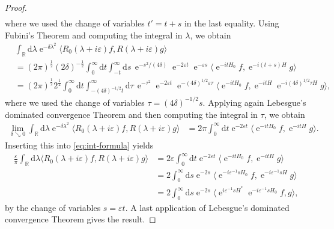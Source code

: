 \documentclass[10pt,a4paper]{amsart}
\def\R{\mathbb R}
\def\d{\mathrm{d}}
\def\e{\mathop{\mathrm{e}}\nolimits}
\begin{document}
\begin{proof}
\begin{align*}
\end{align*}
where we used the change of variables $t'=t+s$ in the last equality. Using Fubini's Theorem and computing the integral in $\lambda$, we obtain
\begin{align*}
&\int_{\R}\d \lambda \e^{-\delta\lambda^2} \langle R_0(\lambda+i \varepsilon)f, R(\lambda + i \varepsilon) g\rangle \\
&= (2\pi)^\frac12 (2\delta)^{-\frac12} \int_0^\infty \d t \int_{-t}^\infty \d s \,  \e^{-s^2/(4\delta)} \e^{-2\varepsilon t} \e^{-\varepsilon s}  \langle \e^{-itH_0}f, \e^{-i(t+s)H} g\rangle \\
&= (2\pi)^{\frac12} 2^\frac12 \int_0^\infty \d t \int_{-(4\delta)^{-1/2}t}^\infty \d \tau \,  \e^{-\tau^2} \e^{-2\varepsilon t} \e^{-(4\delta)^{1/2}\varepsilon \tau}  \langle \e^{-itH_0}f, \e^{-itH} \e^{-i(4\delta)^{1/2}\tau H} g\rangle ,
\end{align*}
where we used the change of variables $\tau=(4\delta)^{-1/2}s$. Applying again Lebesgue's dominated convergence Theorem and then computing the integral in $\tau$, we obtain
\begin{align*}
\lim_{\delta\searrow 0}\int_{\R}\d \lambda \e^{-\delta\lambda^2} \langle R_0(\lambda+i \varepsilon)f, R(\lambda + i \varepsilon) g\rangle &= 2\pi \int_0^\infty \d t \e^{-2\varepsilon t}  \langle \e^{-itH_0}f, \e^{-itH} g\rangle.
\end{align*}
Inserting this into \eqref{eq:int-formula} yields
\begin{align*}
\frac{\varepsilon}{\pi} \int_{\R}\d \lambda \langle R_0(\lambda+i \varepsilon)f, R(\lambda + i \varepsilon) g\rangle &= 2\varepsilon \int_0^\infty \d t \e^{-2\varepsilon t}  \langle \e^{-itH_0}f, \e^{-itH} g\rangle\\
&= 2 \int_0^\infty \d s \e^{-2s}  \langle \e^{-i\varepsilon^{-1}sH_0}f, \e^{-i\varepsilon^{-1}sH} g\rangle \\
&= 2 \int_0^\infty \d s \e^{-2s}  \langle \e^{i\varepsilon^{-1}sH^*} \e^{-i\varepsilon^{-1}sH_0}f,  g\rangle ,
\end{align*}
by the change of variables $s=\varepsilon t$. A last application of Lebesgue's dominated convergence Theorem gives the result.
\end{proof}
\end{document}
